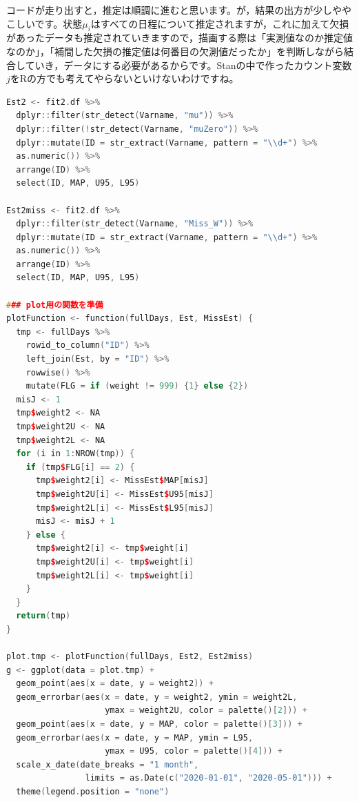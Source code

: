 \documentclass{ltjsbook}
\begin{document}
コードが走り出すと，推定は順調に進むと思います。が，結果の出方が少しややこしいです。状態$\mu_i$はすべての日程について推定されますが，これに加えて欠損があったデータも推定されていきますので，描画する際は「実測値なのか推定値なのか」，「補間した欠損の推定値は何番目の欠測値だったか」を判断しながら結合していき，データにする必要があるからです。Stanの中で作ったカウント変数$j$をRの方でも考えてやらないといけないわけですね。
\begin{lstlisting}[language=c++,label={code:29_04b},caption={プロット用にデータを整形する関数とプロットのコード}]
Est2 <- fit2.df %>%
  dplyr::filter(str_detect(Varname, "mu")) %>%
  dplyr::filter(!str_detect(Varname, "muZero")) %>%
  dplyr::mutate(ID = str_extract(Varname, pattern = "\\d+") %>% 
  as.numeric()) %>%
  arrange(ID) %>%
  select(ID, MAP, U95, L95)

Est2miss <- fit2.df %>%
  dplyr::filter(str_detect(Varname, "Miss_W")) %>%
  dplyr::mutate(ID = str_extract(Varname, pattern = "\\d+") %>% 
  as.numeric()) %>%
  arrange(ID) %>%
  select(ID, MAP, U95, L95)

### plot用の関数を準備
plotFunction <- function(fullDays, Est, MissEst) {
  tmp <- fullDays %>%
    rowid_to_column("ID") %>%
    left_join(Est, by = "ID") %>%
    rowwise() %>%
    mutate(FLG = if (weight != 999) {1} else {2})
  misJ <- 1
  tmp$weight2 <- NA
  tmp$weight2U <- NA
  tmp$weight2L <- NA
  for (i in 1:NROW(tmp)) {
    if (tmp$FLG[i] == 2) {
      tmp$weight2[i] <- MissEst$MAP[misJ]
      tmp$weight2U[i] <- MissEst$U95[misJ]
      tmp$weight2L[i] <- MissEst$L95[misJ]
      misJ <- misJ + 1
    } else {
      tmp$weight2[i] <- tmp$weight[i]
      tmp$weight2U[i] <- tmp$weight[i]
      tmp$weight2L[i] <- tmp$weight[i]
    }
  }
  return(tmp)
}

plot.tmp <- plotFunction(fullDays, Est2, Est2miss)
g <- ggplot(data = plot.tmp) +
  geom_point(aes(x = date, y = weight2)) +
  geom_errorbar(aes(x = date, y = weight2, ymin = weight2L, 
                    ymax = weight2U, color = palette()[2])) +
  geom_point(aes(x = date, y = MAP, color = palette()[3])) +
  geom_errorbar(aes(x = date, y = MAP, ymin = L95, 
                    ymax = U95, color = palette()[4])) +
  scale_x_date(date_breaks = "1 month", 
                limits = as.Date(c("2020-01-01", "2020-05-01"))) +
  theme(legend.position = "none")
\end{lstlisting}
\end{document}
